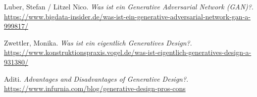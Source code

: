 \begin{thebibliography}{99}
     Luber, Stefan / Litzel Nico. \textit{Was ist ein Generative Adversarial Network (GAN)?}. \url{https://www.bigdata-insider.de/was-ist-ein-generative-adversarial-network-gan-a-999817/}

     Zwettler, Monika. \textit{Was ist ein eigentlich Generatives Design?}. \url{https://www.konstruktionspraxis.vogel.de/was-ist-eigentlich-generatives-design-a-931380/}

     Aditi. \textit{Advantages and Disadvantages of Generative Design?}. \url{https://www.infurnia.com/blog/generative-design-pros-cons}





\end{thebibliography}